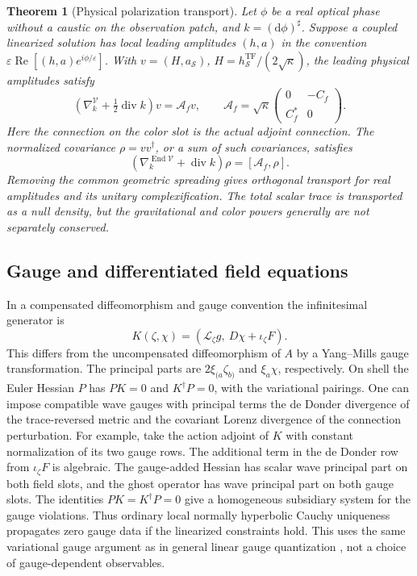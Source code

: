 \documentclass[11pt]{article}
\newtheorem{theorem}{Theorem}
\newcommand{\dd}{\mathrm d}
\newcommand{\TF}{\mathrm{TF}}
\newcommand{\Div}{\operatorname{div}}
\newcommand{\eps}{\varepsilon}
\begin{document}
\begin{theorem}[Physical polarization transport]\label{thm:transport}
 Let \(\phi\) be a real optical phase without a caustic on the observation patch, and \(k=(\dd\phi)^\sharp\). Suppose a coupled linearized solution has local leading amplitudes \((h,a)\) in the convention \(\eps\operatorname{Re}[(h,a)e^{i\phi/\eps}]\). With \(v=(H,a_{\mathcal S})\), \(H=h_{\mathcal S}^{\TF}/(2\sqrt{\kappa})\), the leading physical amplitudes satisfy
 \begin{equation}\label{eq:transport}
 \left(\nabla^{\mathcal V}_k+\tfrac12\Div k\right)v
    =\mathcal A_f v,\qquad
 \mathcal A_f=\sqrt{\kappa}
      \begin{pmatrix}0&-C_f\\ C_f^*&0\end{pmatrix}.
 \end{equation}
 Here the connection on the color slot is the actual adjoint connection. The normalized covariance \(\rho=vv^\dagger\), or a sum of such covariances, satisfies
 \begin{equation}\label{eq:density}
 (\nabla^{\operatorname{End}\mathcal V}_k+\Div k)\rho
          =[\mathcal A_f,\rho].
 \end{equation}
 Removing the common geometric spreading gives orthogonal transport for real amplitudes and its unitary complexification. The total scalar trace is transported as a null density, but the gravitational and color powers generally are not separately conserved.
\end{theorem}

\subsection{Gauge and differentiated field equations}
In a compensated diffeomorphism and gauge convention the infinitesimal generator is
\[
 K(\zeta,\chi)=(\mathcal L_\zeta g,\ D\chi+\iota_\zeta F).
\]
This differs from the uncompensated diffeomorphism of \(A\) by a Yang--Mills gauge transformation. The principal parts are \(2\xi_{(a}\zeta_{b)}\) and \(\xi_a\chi\), respectively. On shell the Euler Hessian \(P\) has \(PK=0\) and \(K^\dagger P=0\), with the variational pairings. One can impose compatible wave gauges with principal terms the de Donder divergence of the trace-reversed metric and the covariant Lorenz divergence of the connection perturbation. For example, take the action adjoint of \(K\) with constant normalization of its two gauge rows. The additional term in the de Donder row from \(\iota_\zeta F\) is algebraic. The gauge-added Hessian has scalar wave principal part on both field slots, and the ghost operator has wave principal part on both gauge slots. The identities \(PK=K^\dagger P=0\) give a homogeneous subsidiary system for the gauge violations. Thus ordinary local normally hyperbolic Cauchy uniqueness propagates zero gauge data if the linearized constraints hold. This uses the same variational gauge argument as in general linear gauge quantization \cite{hs}, not a choice of gauge-dependent observables.
\end{document}
